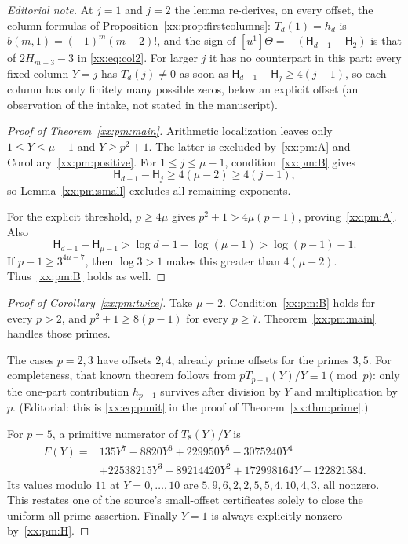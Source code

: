 \documentclass[11pt,a4paper]{article}
\numberwithin{equation}{section}
\theoremstyle{definition}
\theoremstyle{remark}
\theoremstyle{plain}
\newcommand{\coef}[2]{[#1^{#2}]}
\begin{document}
\emph{Editorial note.}  At $j=1$ and $j=2$ the lemma re-derives, on every
offset, the column formulas of Proposition~\ref{xx:prop:firstcolumns}:
$T_d(1)=h_d$ is $b(m,1)=(-1)^m(m-2)!$, and the sign of
$\coef{u}{1}\Theta=-(\mathsf H_{d-1}-\mathsf H_2)$ is that of
$2H_{m-3}-3$ in \eqref{xx:eq:col2}.  For larger $j$ it has no counterpart in
this part: every fixed column $Y=j$ has $T_d(j)\ne0$ as soon as
$\mathsf H_{d-1}-\mathsf H_j\ge4(j-1)$, so each column has only finitely many
possible zeros, below an explicit offset (an observation of the intake, not
stated in the manuscript).

\begin{proof}[Proof of Theorem~\ref{xx:pm:main}]
Arithmetic localization leaves only $1\le Y\le\mu-1$ and $Y\ge p^2+1$. The
latter is excluded by~\eqref{xx:pm:A} and Corollary~\ref{xx:pm:positive}. For
$1\le j\le\mu-1$, condition~\eqref{xx:pm:B} gives
\[
 \mathsf H_{d-1}-\mathsf H_j\ge4(\mu-2)\ge4(j-1),
\]
so Lemma~\ref{xx:pm:small} excludes all remaining exponents.

For the explicit threshold, $p\ge4\mu$ gives $p^2+1>4\mu(p-1)$,
proving~\eqref{xx:pm:A}. Also
\[
 \mathsf H_{d-1}-\mathsf H_{\mu-1}>\log d-1-\log(\mu-1)>\log(p-1)-1.
\]
If $p-1\ge3^{4\mu-7}$, then $\log3>1$ makes this greater than $4(\mu-2)$.
Thus~\eqref{xx:pm:B} holds as well.
\end{proof}

\begin{proof}[Proof of Corollary~\ref{xx:pm:twice}]
Take $\mu=2$. Condition~\eqref{xx:pm:B} holds for every $p>2$, and
$p^2+1\ge8(p-1)$ for every $p\ge7$. Theorem~\ref{xx:pm:main} handles those
primes.

The cases $p=2,3$ have offsets $2,4$, already prime offsets for the primes
$3,5$. For completeness, that known theorem follows from
$pT_{p-1}(Y)/Y\equiv1\pmod p$: only the one-part contribution $h_{p-1}$ survives
after division by $Y$ and multiplication by $p$.  (Editorial: this is
\eqref{xx:eq:punit} in the proof of Theorem~\ref{xx:thm:prime}.)

For $p=5$, a primitive numerator of $T_8(Y)/Y$ is
\begin{align*}
 F(Y)={}&135Y^7-8820Y^6+229950Y^5-3075240Y^4\\
 &+22538215Y^3-89214420Y^2+172998164Y-122821584.
\end{align*}
Its values modulo $11$ at $Y=0,\ldots,10$ are
$5,9,6,2,2,5,5,4,10,4,3$, all nonzero. This restates one of the source's
small-offset certificates solely to close the uniform all-prime assertion.
Finally $Y=1$ is always explicitly nonzero by~\eqref{xx:pm:H}.
\end{proof}
\end{document}
